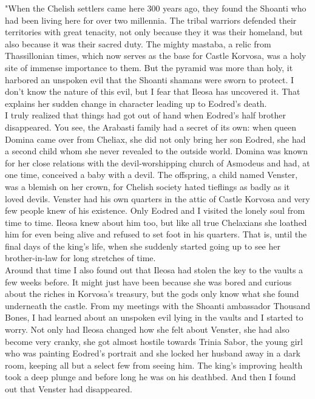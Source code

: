 "When the Chelish settlers came here 300 years ago, they found the Shoanti who had been living here for over two millennia. The tribal warriors defended their territories with great tenacity, not only because they it was their homeland, but also because it was their sacred duty. The mighty mastaba, a relic from Thassillonian times, which now serves as the base for Castle Korvosa, was a holy site of immense importance to them. But the pyramid was more than holy, it harbored an unspoken evil that the Shoanti shamans were sworn to protect. I don't know the nature of this evil, but I fear that Ileosa has uncovered it. That explains her sudden change in character leading up to Eodred's death.\\

I truly realized that things had got out of hand when Eodred's half brother disappeared. You see, the Arabasti family had a secret of its own: when queen Domina came over from Cheliax, she did not only bring her son Eodred, she had a second child whom she never revealed to the outside world. Domina was known for her close relations with the devil-worshipping church of Asmodeus and had, at one time, conceived a baby with a devil. The offspring, a child named Venster, was a blemish on her crown, for Chelish society hated tieflings as badly as it loved devils. Venster had his own quarters in the attic of Castle Korvosa and very few people knew of his existence. Only Eodred and I visited the lonely soul from time to time. Ileosa knew about him too, but like all true Chelaxians she loathed him for even being alive and refused to set foot in his quarters. That is, until the final days of the king's life, when she suddenly started going up to see her brother-in-law for long stretches of time.\\

Around that time I also found out that Ileosa had stolen the key to the vaults a few weeks before. It might just have been because she was bored and curious about the riches in Korvosa's treasury, but the gods only know what she found underneath the castle. From my meetings with the Shoanti ambassador Thousand Bones, I had learned about an unspoken evil lying in the vaults and I started to worry. Not only had Ileosa changed how she felt about Venster, she had also become very cranky, she got almost hostile towards Trinia Sabor, the young girl who was painting Eodred's portrait and she locked her husband away in a dark room, keeping all but a select few from seeing him. The king's improving health took a deep plunge and before long he was on his deathbed. And then I found out that Venster had disappeared.\\

